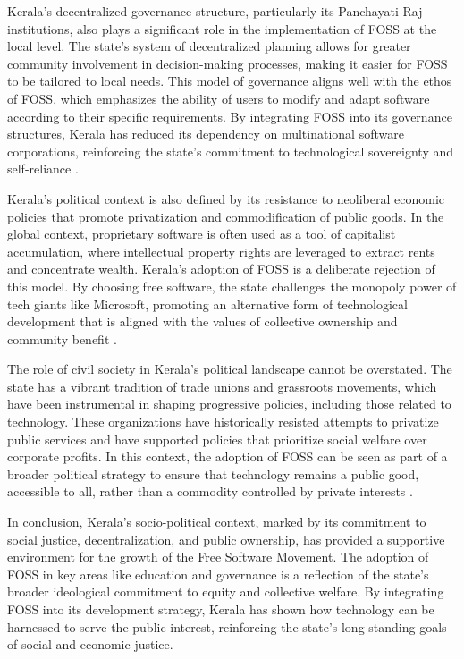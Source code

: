\begin{refsection}
Kerala’s decentralized governance structure, particularly its Panchayati Raj institutions, also plays a significant role in the implementation of FOSS at the local level. The state’s system of decentralized planning allows for greater community involvement in decision-making processes, making it easier for FOSS to be tailored to local needs. This model of governance aligns well with the ethos of FOSS, which emphasizes the ability of users to modify and adapt software according to their specific requirements. By integrating FOSS into its governance structures, Kerala has reduced its dependency on multinational software corporations, reinforcing the state's commitment to technological sovereignty and self-reliance \cite[pp.~45-47]{isaac2000local}.

Kerala’s political context is also defined by its resistance to neoliberal economic policies that promote privatization and commodification of public goods. In the global context, proprietary software is often used as a tool of capitalist accumulation, where intellectual property rights are leveraged to extract rents and concentrate wealth. Kerala’s adoption of FOSS is a deliberate rejection of this model. By choosing free software, the state challenges the monopoly power of tech giants like Microsoft, promoting an alternative form of technological development that is aligned with the values of collective ownership and community benefit \cite[pp.~11-13]{palackal2007information}.

The role of civil society in Kerala’s political landscape cannot be overstated. The state has a vibrant tradition of trade unions and grassroots movements, which have been instrumental in shaping progressive policies, including those related to technology. These organizations have historically resisted attempts to privatize public services and have supported policies that prioritize social welfare over corporate profits. In this context, the adoption of FOSS can be seen as part of a broader political strategy to ensure that technology remains a public good, accessible to all, rather than a commodity controlled by private interests \cite{ramachandran1997keraladev}.

In conclusion, Kerala’s socio-political context, marked by its commitment to social justice, decentralization, and public ownership, has provided a supportive environment for the growth of the Free Software Movement. The adoption of FOSS in key areas like education and governance is a reflection of the state’s broader ideological commitment to equity and collective welfare. By integrating FOSS into its development strategy, Kerala has shown how technology can be harnessed to serve the public interest, reinforcing the state’s long-standing goals of social and economic justice.


\end{refsection}
